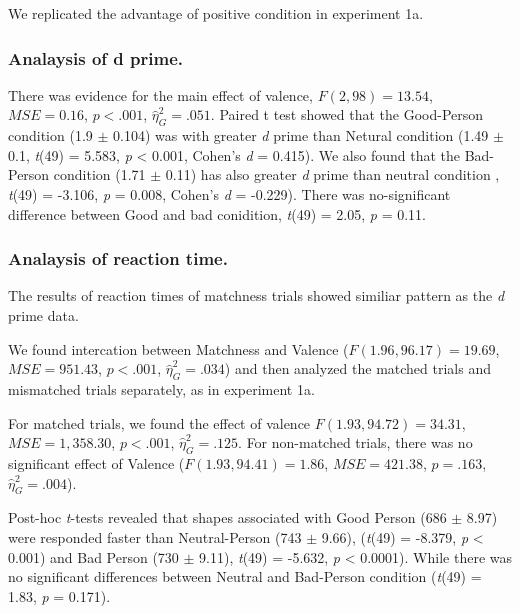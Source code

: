 \documentclass[man]{apa6}
\begin{document}
We replicated the advantage of positive condition in experiment 1a.

\hypertarget{analaysis-of-d-prime.-1}{%
\subsubsection{Analaysis of d prime.}\label{analaysis-of-d-prime.-1}}

There was evidence for the main effect of valence, \(F(2, 98) = 13.54\), \(\mathit{MSE} = 0.16\), \(p < .001\), \(\hat{\eta}^2_G = .051\). Paired t test showed that the Good-Person condition (1.9 \(\pm\) 0.104) was with greater \emph{d} prime than Netural condition (1.49 \(\pm\) 0.1, \emph{t}(49) = 5.583, \emph{p} \textless{} 0.001, Cohen's \emph{d} = 0.415). We also found that the Bad-Person condition (1.71 \(\pm\) 0.11) has also greater \emph{d} prime than neutral condition , \emph{t}(49) = -3.106, \emph{p} = 0.008, Cohen's \emph{d} = -0.229). There was no-significant difference between Good and bad conidition, \emph{t}(49) = 2.05, \emph{p} = 0.11.

\hypertarget{analaysis-of-reaction-time.-1}{%
\subsubsection{Analaysis of reaction time.}\label{analaysis-of-reaction-time.-1}}

The results of reaction times of matchness trials showed similiar pattern as the \emph{d} prime data.

We found intercation between Matchness and Valence (\(F(1.96, 96.17) = 19.69\), \(\mathit{MSE} = 951.43\), \(p < .001\), \(\hat{\eta}^2_G = .034\)) and then analyzed the matched trials and mismatched trials separately, as in experiment 1a.

For matched trials, we found the effect of valence \(F(1.93, 94.72) = 34.31\), \(\mathit{MSE} = 1,358.30\), \(p < .001\), \(\hat{\eta}^2_G = .125\). For non-matched trials, there was no significant effect of Valence (\(F(1.93, 94.41) = 1.86\), \(\mathit{MSE} = 421.38\), \(p = .163\), \(\hat{\eta}^2_G = .004\)).

Post-hoc \emph{t}-tests revealed that shapes associated with Good Person (686 \(\pm\) 8.97) were responded faster than Neutral-Person (743 \(\pm\) 9.66), (\emph{t}(49) = -8.379, \emph{p} \textless{} 0.001) and Bad Person (730 \(\pm\) 9.11), \emph{t}(49) = -5.632, \emph{p} \textless{} 0.0001). While there was no significant differences between Neutral and Bad-Person condition (\emph{t}(49) = 1.83, \emph{p} = 0.171).
\end{document}

